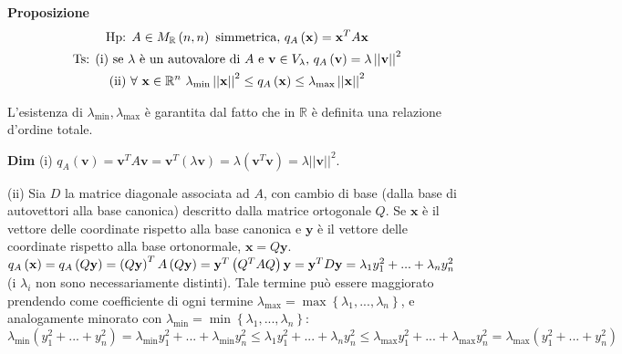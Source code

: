 \documentclass{article}
\begin{document}
\textbf{Proposizione}%
\begin{gather*}
\text{Hp}\text{: }A\in M_{%
\mathbb{R}
}\left( n,n\right) \text{ simmetrica, }q_{A}\left( \mathbf{x}\right) =%
\mathbf{x}^{T}A\mathbf{x} \\
\text{Ts}\text{: (i) se }\lambda \text{ \`{e} un autovalore di }A\text{ e }%
\mathbf{v}\in V_{\lambda }\text{, }q_{A}\left( \mathbf{v}\right) =\lambda
\left\vert \left\vert \mathbf{v}\right\vert \right\vert ^{2} \\
\text{(ii) }\forall \text{ }\mathbf{x}\in 
\mathbb{R}
^{n}\text{ }\lambda _{\min }\left\vert \left\vert \mathbf{x}\right\vert
\right\vert ^{2}\leq q_{A}\left( \mathbf{x}\right) \leq \lambda _{\max
}\left\vert \left\vert \mathbf{x}\right\vert \right\vert ^{2}
\end{gather*}

L'esistenza di $\lambda _{\min },\lambda _{\max }$ \`{e} garantita dal fatto
che in $%
\mathbb{R}
$ \`{e} definita una relazione d'ordine totale.

\textbf{Dim} (i) $q_{A}\left( \mathbf{v}\right) =\mathbf{v}^{T}A\mathbf{v=v}%
^{T}\left( \lambda \mathbf{v}\right) =\lambda \left( \mathbf{v}^{T}\mathbf{v}%
\right) =\lambda \left\vert \left\vert \mathbf{v}\right\vert \right\vert
^{2} $.

(ii) Sia $D$ la matrice diagonale associata ad $A$, con cambio di base
(dalla base di autovettori alla base canonica) descritto dalla matrice
ortogonale $Q$. Se $\mathbf{x}$ \`{e} il vettore delle coordinate rispetto
alla base canonica e $\mathbf{y}$ \`{e} il vettore delle coordinate rispetto
alla base ortonormale, $\mathbf{x}=Q\mathbf{y}$. $q_{A}\left( \mathbf{x}%
\right) =q_{A}\left( Q\mathbf{y}\right) =\left( Q\mathbf{y}\right)
^{T}A\left( Q\mathbf{y}\right) =\mathbf{y}^{T}\left( Q^{T}AQ\right) \mathbf{%
y=y}^{T}D\mathbf{y}=\lambda _{1}y_{1}^{2}+...+\lambda _{n}y_{n}^{2}$ (i $%
\lambda _{i}$ non sono necessariamente distinti). Tale termine pu\`{o}
essere maggiorato prendendo come coefficiente di ogni termine $\lambda
_{\max }=\max \left\{ \lambda _{1},...,\lambda _{n}\right\} $, e
analogamente minorato con $\lambda _{\min }=\min \left\{ \lambda
_{1},...,\lambda _{n}\right\} $:%
\begin{equation*}
\lambda _{\min }\left( y_{1}^{2}+...+y_{n}^{2}\right) =\lambda _{\min
}y_{1}^{2}+...+\lambda _{\min }y_{n}^{2}\leq \lambda
_{1}y_{1}^{2}+...+\lambda _{n}y_{n}^{2}\leq \lambda _{\max
}y_{1}^{2}+...+\lambda _{\max }y_{n}^{2}=\lambda _{\max }\left(
y_{1}^{2}+...+y_{n}^{2}\right)
\end{equation*}
\end{document}
